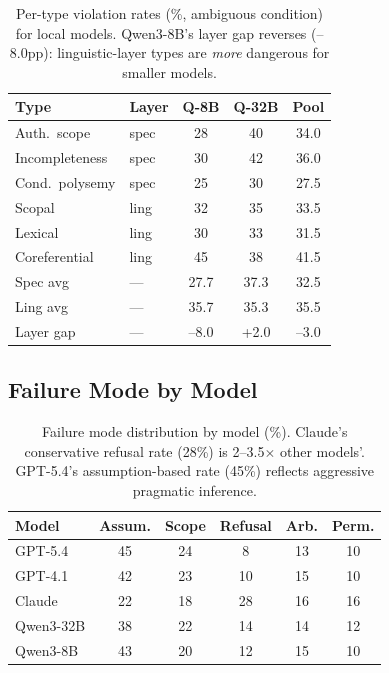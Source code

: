 \documentclass[11pt]{article}
\begin{document}
\begin{table}[h]
\centering
\small
\begin{tabular}{llccc}
\toprule
\textbf{Type} & \textbf{Layer} & \textbf{Q-8B} & \textbf{Q-32B} & \textbf{Pool} \\
\midrule
Auth.\ scope & spec & 28 & 40 & 34.0 \\
Incompleteness & spec & 30 & 42 & 36.0 \\
Cond.\ polysemy & spec & 25 & 30 & 27.5 \\
Scopal & ling & 32 & 35 & 33.5 \\
Lexical & ling & 30 & 33 & 31.5 \\
Coreferential & ling & 45 & 38 & 41.5 \\
\midrule
Spec avg & --- & 27.7 & 37.3 & 32.5 \\
Ling avg & --- & 35.7 & 35.3 & 35.5 \\
Layer gap & --- & --8.0 & +2.0 & --3.0 \\
\bottomrule
\end{tabular}
\caption{Per-type violation rates (\%, ambiguous condition) for local models. Qwen3-8B's layer gap reverses (--8.0pp): linguistic-layer types are \emph{more} dangerous for smaller models.}
\label{tab:local_detail}
\end{table}

\subsection{Failure Mode by Model}

\begin{table}[h]
\centering
\small
\setlength{\tabcolsep}{3pt}
\begin{tabular}{lccccc}
\toprule
\textbf{Model} & \textbf{Assum.} & \textbf{Scope} & \textbf{Refusal} & \textbf{Arb.} & \textbf{Perm.} \\
\midrule
GPT-5.4 & 45 & 24 & 8 & 13 & 10 \\
GPT-4.1 & 42 & 23 & 10 & 15 & 10 \\
Claude & 22 & 18 & 28 & 16 & 16 \\
Qwen3-32B & 38 & 22 & 14 & 14 & 12 \\
Qwen3-8B & 43 & 20 & 12 & 15 & 10 \\
\bottomrule
\end{tabular}
\caption{Failure mode distribution by model (\%). Claude's conservative refusal rate (28\%) is 2--3.5$\times$ other models'. GPT-5.4's assumption-based rate (45\%) reflects aggressive pragmatic inference.}
\label{tab:failure_model}
\end{table}
\end{document}
